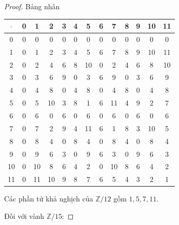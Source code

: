 \begin{proof}
    \par Bảng nhân
    \\
    \begin{tabular}{c|cccccccccccc}
        $\cdot$ & 0 & 1  & 2  & 3 & 4 & 5  & 6 & 7  & 8 & 9 & 10 & 11 \\
        \hline
        0       & 0 & 0  & 0  & 0 & 0 & 0  & 0 & 0  & 0 & 0 & 0  & 0  \\
        1       & 0 & 1  & 2  & 3 & 4 & 5  & 6 & 7  & 8 & 9 & 10 & 11 \\
        2       & 0 & 2  & 4  & 6 & 8 & 10 & 0 & 2  & 4 & 6 & 8  & 10 \\
        3       & 0 & 3  & 6  & 9 & 0 & 3  & 6 & 9  & 0 & 3 & 6  & 9  \\
        4       & 0 & 4  & 8  & 0 & 4 & 8  & 0 & 4  & 8 & 0 & 4  & 8  \\
        5       & 0 & 5  & 10 & 3 & 8 & 1  & 6 & 11 & 4 & 9 & 2  & 7  \\
        6       & 0 & 6  & 0  & 6 & 0 & 6  & 0 & 6  & 0 & 6 & 0  & 6  \\
        7       & 0 & 7  & 2  & 9 & 4 & 11 & 6 & 1  & 8 & 3 & 10 & 5  \\
        8       & 0 & 8  & 4  & 0 & 8 & 4  & 0 & 8  & 4 & 0 & 8  & 4  \\
        9       & 0 & 9  & 6  & 3 & 0 & 9  & 6 & 3  & 0 & 9 & 6  & 3  \\
        10      & 0 & 10 & 8  & 6 & 4 & 2  & 0 & 10 & 8 & 6 & 4  & 2  \\
        11      & 0 & 11 & 10 & 9 & 8 & 7  & 6 & 5  & 4 & 3 & 2  & 1
    \end{tabular}

    \par Các phần tử khả nghịch của $\mathbb{Z}/12$ gồm $1, 5, 7, 11$.

    \bigskip
    \bigskip

    \par Đối với vành $\mathbb{Z}/15$:

    \bigskip


\end{proof}
